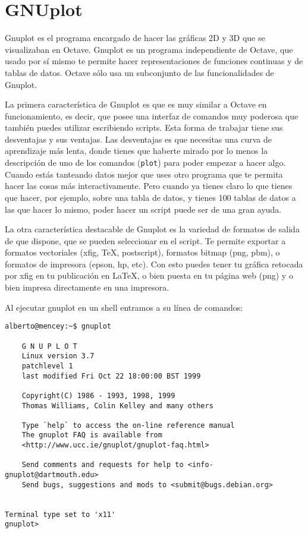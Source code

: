 
\chapter{GNUplot}
\label{gnuplot.tex}


Gnuplot es el programa encargado de hacer  las gráficas 2D y 3D que se
visualizaban  en  Octave.  Gnuplot  es un  programa  independiente  de
Octave, que  usado por sí  mismo te permite hacer  representaciones de
funciones  continuas  y  de  tablas  de  datos.  Octave  sólo  usa  un
subconjunto de las funcionalidades de Gnuplot.

La primera característica  de Gnuplot es que es muy  similar a Octave
en funcionamiento,  es decir, que  posee una interfaz de  comandos muy
poderosa que  también puedes utilizar escribiendo  scripts. Esta forma
de trabajar tiene  sus desventajas y sus ventajas.  Las desventajas es
que necesitas  una curva  de aprendizaje más  lenta, donde  tienes que
haberte mirado  por lo  menos la  descripción de  uno de  los comandos
({\tt plot}) para  poder empezar a hacer algo.  Cuando estás tanteando
datos mejor que uses otro programa  que te permita hacer las cosas más
interactivamente. Pero cuando ya tienes claro lo que tienes que hacer,
por ejemplo, sobre una tabla de datos,  y tienes 100 tablas de datos a
las que hacer  lo mismo, poder hacer  un script puede ser  de una gran
ayuda.

La  otra  característica  destacable  de Gnuplot  es  la  variedad  de
formatos de  salida de que  dispone, que  se pueden seleccionar  en el
script.  Te permite  exportar  a formatos  vectoriales (xfig,  {\TeX},
postscript),  formatos  bitmap (png,  pbm),  o  formatos de  impresora
(epson, hp, etc).  Con esto puedes tener tu gráfica  retocada por xfig
en tu publicación en  LaTeX, o bien puesta en tu página  web (png) y o
bien impresa directamente en una impresora.

Al ejecutar gnuplot en un shell entramos a su línea de comandos:

\begin{verbatim}
alberto@mencey:~$ gnuplot

	G N U P L O T
	Linux version 3.7
	patchlevel 1
	last modified Fri Oct 22 18:00:00 BST 1999

	Copyright(C) 1986 - 1993, 1998, 1999
	Thomas Williams, Colin Kelley and many others

	Type `help` to access the on-line reference manual
	The gnuplot FAQ is available from
	<http://www.ucc.ie/gnuplot/gnuplot-faq.html>

	Send comments and requests for help to <info-gnuplot@dartmouth.edu>
	Send bugs, suggestions and mods to <submit@bugs.debian.org>


Terminal type set to 'x11'
gnuplot> 
\end{verbatim}

